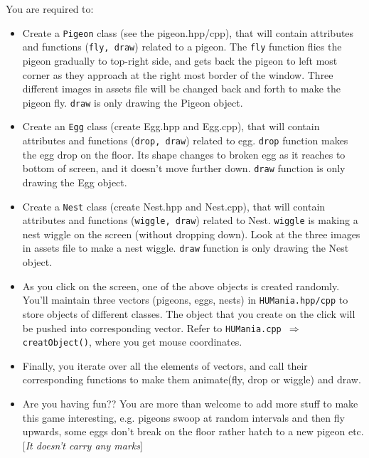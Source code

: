 \documentclass[a4paper,12pt]{article}
\begin{document}
You are required to:
\begin{itemize}
	\item Create a \texttt{Pigeon} class (see the pigeon.hpp/cpp), that will contain attributes and functions (\texttt{fly, draw}) related to a pigeon. The \texttt{fly} function flies the pigeon gradually to top-right side, and gets back the pigeon to left most corner as they approach at the right most border of the window. Three different images in assets file will be changed back and forth to make the pigeon fly. \texttt{draw} is only drawing the Pigeon object.
	      
	\item Create an \texttt{Egg} class (create Egg.hpp and Egg.cpp), that will contain attributes and functions (\texttt{drop, draw}) related to egg. \texttt{drop} function makes the egg drop on the floor. Its shape changes to broken egg as it reaches to bottom of screen, and it doesn't move further down. \texttt{draw} function is only drawing the Egg object.
	      
	\item Create a \texttt{Nest} class (create Nest.hpp and Nest.cpp), that will contain attributes and functions (\texttt{wiggle, draw}) related to Nest. \texttt{wiggle} is making a nest wiggle on the screen (without dropping down). Look at the three images in assets file to make a nest wiggle. \texttt{draw} function is only drawing the Nest object.
	      
	\item As you click on the screen, one of the above objects is created randomly. You'll maintain three vectors (pigeons, eggs, nests) in \texttt{HUMania.hpp/cpp} to store objects of different classes. The object that you create on the click will be pushed into corresponding vector. Refer to \texttt{HUMania.cpp $ \Rightarrow $ creatObject()}, where you get mouse coordinates.
	      
	\item Finally, you iterate over all the elements of vectors, and call their corresponding functions to make them animate(fly, drop or wiggle) and draw.
	      
	\item Are you having fun?? You are more than welcome to add more stuff to make this game interesting, e.g. pigeons swoop at random intervals and then fly upwards, some eggs don't break on the floor rather hatch to a new pigeon etc. [\textit{It doesn't carry any marks}]
\end{itemize}
\end{document}
